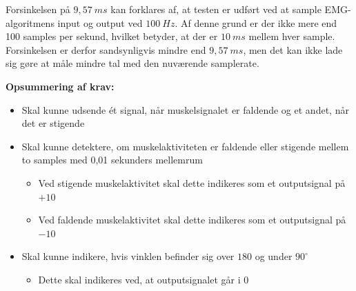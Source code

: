 Forsinkelsen på $9,57~ms$ kan forklares af, at testen er udført ved at sample EMG-algoritmens input og output ved $100~Hz$. Af denne grund er der ikke mere end 100 samples per sekund, hvilket betyder, at der er $10~ms$ mellem hver sample. Forsinkelsen er derfor sandsynligvis mindre end $9,57~ms$, men det kan ikke lade sig gøre at måle mindre tal med den nuværende samplerate. 

\vspace{3mm}
\textbf{Opsummering af krav:}
\begin{itemize}
\item Skal kunne udsende ét signal, når muskelsignalet er faldende og et andet, når det er stigende
\item Skal kunne detektere, om muskelaktiviteten er faldende eller stigende mellem to samples med 0,01 sekunders mellemrum
\begin{itemize}
\item Ved stigende muskelaktivitet skal dette indikeres som et outputsignal på $+10$
\item Ved faldende muskelaktivitet skal dette indikeres som et outputsignal på $-10$
\end{itemize}
\item Skal kunne indikere, hvis vinklen befinder sig over $180$ og under $90^{\circ}$
\begin{itemize}
\item Dette skal indikeres ved, at outputsignalet går i $0$
\end{itemize}
\end{itemize}